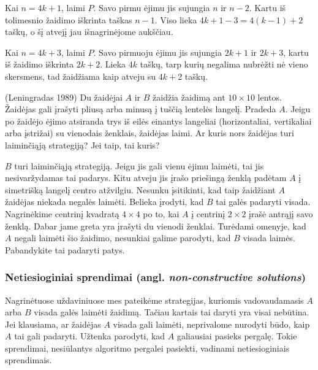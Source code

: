 \begin{sprendimas}
  Kai $n=4k+1$, laimi $P$. Savo pirmu ėjimu jis sujungia $n$ ir $n-2$. Kartu
  iš tolimesnio žaidimo iškrinta taškas $n-1$. Viso lieka $4k+1-3=4(k-1)+2$
  taškų, o šį atvejį jau išnagrinėjome aukščiau. 

  Kai $n=4k+3$, laimi $P$. Savo pirmuoju ėjimu jis sujungia $2k+1$ ir $2k+3$,
  kartu iš žaidimo iškrinta $2k+2$. Lieka $4k$ taškų, tarp kurių negalima
  nubrėžti nė vieno skersmens, tad žaidžiama kaip atveju su $4k+2$ taškų. 
\end{sprendimas}

\begin{pavnr}{(Leningradas 1989)}
  Du žaidėjai $A$ ir $B$ žaidžia žaidimą ant $10\times 10$ lentos. Žaidėjas
  gali įrašyti pliusą arba minusą į tuščią lentelės langelį. Pradeda $A$.
  Jeigu po žaidėjo ėjimo atsiranda trys iš eilės einantys langeliai
  (horizontaliai, vertikaliai arba įstrižai) su vienodais ženklais,
  žaidėjas laimi. Ar kuris nors žaidėjas turi laiminčiąją strategiją? Jei
  taip, tai kuris?
\end{pavnr}

\begin{sprendimas}
  $B$ turi laiminčiąją strategiją. Jeigu jis gali vienu ėjimu laimėti, tai jis
  nesivaržydamas  tai padarys. Kitu atveju jis įrašo priešingą ženklą padėtam
  $A$ į simetrišką langelį centro atžvilgiu. Nesunku įsitikinti, kad taip
  žaidžiant $A$ žaidėjas niekada negalės laimėti. Belieka
  įrodyti, kad $B$ tai galės padaryti visada. Nagrinėkime centrinį kvadratą
  $4\times 4$ po to, kai $A$ į centrinį $2\times 2$ įrašė antrąjį savo
  ženklą. Dabar jame greta yra įrašyti du vienodi ženklai. Turėdami omenyje,
  kad $A$ negali laimėti šio žaidimo, nesunkiai galime parodyti, kad $B$ visada
  laimės. Pabandykite tai padaryti patys.  
\end{sprendimas}

\subsubsection{Netiesioginiai sprendimai (angl. \emph{non-constructive solutions})}

Nagrinėtuose uždaviniuose mes pateikėme strategijas, kuriomis
vadovaudamasis $A$ arba $B$ visada galės laimėti žaidimą. Tačiau kartais tai
daryti yra visai nebūtina. Jei klausiama, ar žaidėjas $A$ visada gali
laimėti, neprivalome nurodyti būdo, kaip $A$ tai gali padaryti. Užtenka
parodyti, kad $A$ galiausiai pasieks pergalę. Tokie sprendimai, nesiūlantys
algoritmo pergalei pasiekti, vadinami netiesioginiais sprendimais. 

